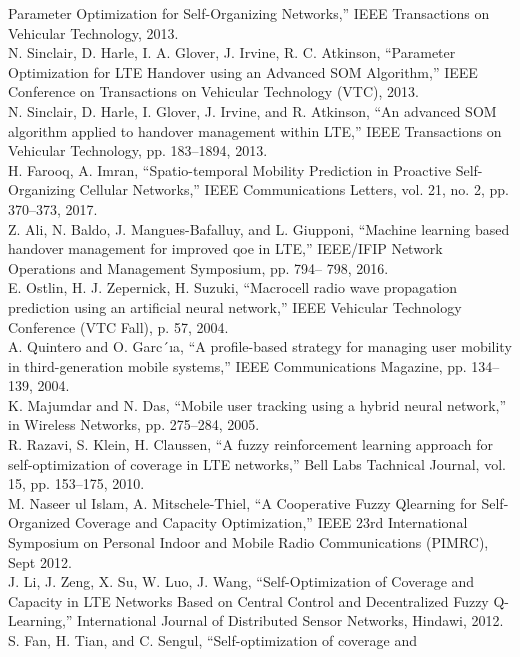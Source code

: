 \documentclass[12pt]{article}
\begin{document}
\begin{multicols}{2}
Parameter Optimization for Self-Organizing Networks,” IEEE
Transactions on Vehicular Technology, 2013.
\\ \noindent [144] N. Sinclair, D. Harle, I. A. Glover, J. Irvine, R. C. Atkinson, “Parameter
Optimization for LTE Handover using an Advanced SOM Algorithm,”
IEEE Conference on Transactions on Vehicular Technology (VTC),
2013.
\\ \noindent [145] N. Sinclair, D. Harle, I. Glover, J. Irvine, and R. Atkinson, “An
advanced SOM algorithm applied to handover management within
LTE,” IEEE Transactions on Vehicular Technology, pp. 183–1894,
2013.
\\ \noindent [146] H. Farooq, A. Imran, “Spatio-temporal Mobility Prediction in Proactive
Self-Organizing Cellular Networks,” IEEE Communications Letters,
vol. 21, no. 2, pp. 370–373, 2017.
\\ \noindent [147] Z. Ali, N. Baldo, J. Mangues-Bafalluy, and L. Giupponi, “Machine
learning based handover management for improved qoe in LTE,”
IEEE/IFIP Network Operations and Management Symposium, pp. 794–
798, 2016.
\\ \noindent [148] E. Ostlin, H. J. Zepernick, H. Suzuki, “Macrocell radio wave propagation
prediction using an artificial neural network,” IEEE Vehicular
Technology Conference (VTC Fall), p. 57, 2004.
\\ \noindent [149] A. Quintero and O. Garc´ıa, “A profile-based strategy for managing user
mobility in third-generation mobile systems,” IEEE Communications
Magazine, pp. 134–139, 2004.
\\ \noindent [150] K. Majumdar and N. Das, “Mobile user tracking using a hybrid neural
network,” in Wireless Networks, pp. 275–284, 2005.
\\ \noindent [151] R. Razavi, S. Klein, H. Claussen, “A fuzzy reinforcement learning
approach for self-optimization of coverage in LTE networks,” Bell Labs
Tachnical Journal, vol. 15, pp. 153–175, 2010.
\\ \noindent [152] M. Naseer ul Islam, A. Mitschele-Thiel, “A Cooperative Fuzzy Qlearning
for Self-Organized Coverage and Capacity Optimization,”
IEEE 23rd International Symposium on Personal Indoor and Mobile
Radio Communications (PIMRC), Sept 2012.
\\ \noindent [153] J. Li, J. Zeng, X. Su, W. Luo, J. Wang, “Self-Optimization of Coverage
and Capacity in LTE Networks Based on Central Control and
Decentralized Fuzzy Q-Learning,” International Journal of Distributed
Sensor Networks, Hindawi, 2012.
\\ \noindent [154] S. Fan, H. Tian, and C. Sengul, “Self-optimization of coverage and

\end{multicols}
\end{document}
